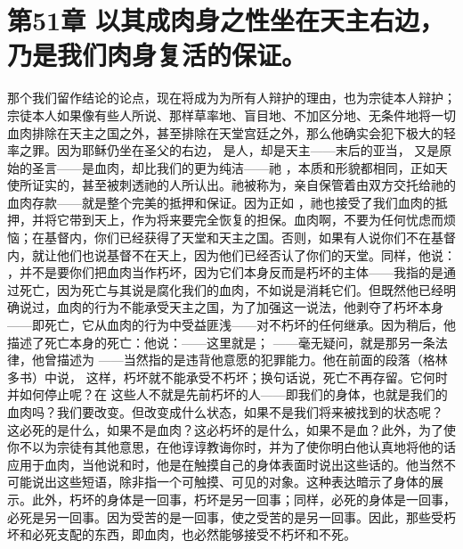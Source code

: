 
\section{第51章 以其成肉身之性坐在天主右边，乃是我们肉身复活的保证。}

那个我们留作结论的论点，现在将成为为所有人辩护的理由，也为宗徒本人辩护；宗徒本人如果像有些人所说、那样草率地、盲目地、不加区分地、无条件地将一切血肉排除在天主之国之外，甚至排除在天堂宫廷之外，那么他确实会犯下极大的轻率之罪。因为耶稣仍坐在圣父的右边， 是人，却是天主——末后的亚当， 又是原始的圣言——是血肉，却比我们的更为纯洁——祂 ，本质和形貌都相同，正如天使所证实的，甚至被刺透祂的人所认出。祂被称为，亲自保管着由双方交托给祂的血肉存款——就是整个完美的抵押和保证。因为正如 ，祂也接受了我们血肉的抵押，并将它带到天上，作为将来要完全恢复的担保。血肉啊，不要为任何忧虑而烦恼；在基督内，你们已经获得了天堂和天主之国。否则，如果有人说你们不在基督内，就让他们也说基督不在天上，因为他们已经否认了你们的天堂。同样，他说：  ，并不是要你们把血肉当作朽坏，因为它们本身反而是朽坏的主体——我指的是通过死亡，因为死亡与其说是腐化我们的血肉，不如说是消耗它们。但既然他已经明确说过，血肉的行为不能承受天主之国，为了加强这一说法，他剥夺了朽坏本身——即死亡，它从血肉的行为中受益匪浅——对不朽坏的任何继承。因为稍后，他描述了死亡本身的死亡：他说：——这里就是； ——毫无疑问，就是那另一条法律，他曾描述为 ——当然指的是违背他意愿的犯罪能力。他在前面的段落（格林多书）中说，  这样，朽坏就不能承受不朽坏；换句话说，死亡不再存留。它何时并如何停止呢？在 这些人不就是先前朽坏的人——即我们的身体，也就是我们的血肉吗？我们要改变。但改变成什么状态，如果不是我们将来被找到的状态呢？ 这必死的是什么，如果不是血肉？这必朽坏的是什么，如果不是血？此外，为了使你不以为宗徒有其他意思，在他谆谆教诲你时，并为了使你明白他认真地将他的话应用于血肉，当他说和时，他是在触摸自己的身体表面时说出这些话的。他当然不可能说出这些短语，除非指一个可触摸、可见的对象。这种表达暗示了身体的展示。此外，朽坏的身体是一回事，朽坏是另一回事；同样，必死的身体是一回事，必死是另一回事。因为受苦的是一回事，使之受苦的是另一回事。因此，那些受朽坏和必死支配的东西，即血肉，也必然能够接受不朽坏和不死。\par

